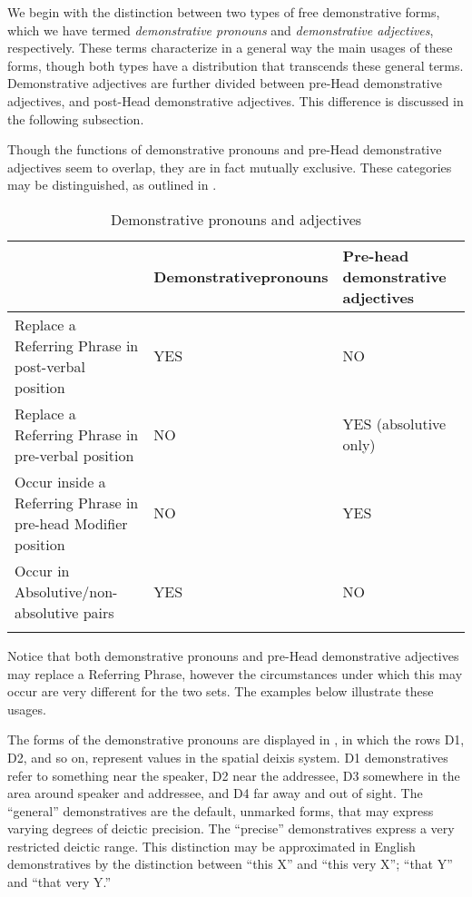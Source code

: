 We begin with the distinction between two types of free demonstrative forms, which we have termed \textit{demonstrative pronouns} and \textit{demonstrative adjectives}, respectively. These terms characterize in a general way the main usages of these forms, though both types have a distribution that transcends these general terms. Demonstrative adjectives are further divided between pre-Head demonstrative adjectives, and post-Head demonstrative adjectives. This difference is discussed in the following subsection.

Though the functions of demonstrative pronouns and pre-Head demonstrative adjectives seem to overlap, they are in fact mutually exclusive. These categories may be distinguished, as outlined in .

\begin{table}
\caption{Demonstrative pronouns and adjectives}
\label{tab:demonstrativepronounsadjectives}
\begin{tabularx}{\textwidth}{Qp{3cm}Q}
\lsptoprule
& Demonstrative\newline  pronouns & Pre-head demonstrative adjectives \\
\midrule
Replace a Referring Phrase in post-verbal position & YES & NO \\
\tablevspace
Replace a Referring Phrase in pre-verbal position & NO & YES (absolutive only) \\
\tablevspace
Occur inside a Referring Phrase in pre-head Modifier position & NO & YES \\
\tablevspace
Occur in Absolutive/non-absolutive pairs & YES & NO \\
\lspbottomrule
\end{tabularx}
\end{table}

Notice that both demonstrative pronouns and pre-Head demonstrative adjectives may replace a Referring Phrase, however the circumstances under which this may occur are very different for the two sets. The examples below illustrate these usages.

The forms of the demonstrative pronouns are displayed in , in which the rows D1, D2, and so on, represent values in the spatial deixis system. D1 demonstratives refer to something near the speaker, D2 near the addressee, D3 somewhere in the area around speaker and addressee, and D4 far away and out of sight. The “general” demonstratives are the default, unmarked forms, that may express varying degrees of deictic precision. The “precise” demonstratives express a very restricted deictic range. This distinction may be approximated in English demonstratives by the distinction between “this X” and “this very X”; “that Y” and “that very Y.”

